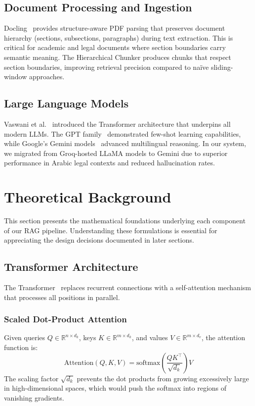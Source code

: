 \documentclass[12pt, a4paper]{article}
\begin{document}
\subsection{Document Processing and Ingestion}
Docling~\cite{docling2024} provides structure-aware PDF parsing that
preserves document hierarchy (sections, subsections, paragraphs) during
text extraction. This is critical for academic and legal documents where
section boundaries carry semantic meaning. The Hierarchical Chunker
produces chunks that respect section boundaries, improving retrieval
precision compared to na\"ive sliding-window approaches.

\subsection{Large Language Models}
Vaswani et al.~\cite{vaswani2017attention} introduced the Transformer
architecture that underpins all modern LLMs. The GPT family~\cite{brown2020gpt3}
demonstrated few-shot learning capabilities, while Google's Gemini
models~\cite{google2024gemini} advanced multilingual reasoning. In our
system, we migrated from Groq-hosted LLaMA models to Gemini due to
superior performance in Arabic legal contexts and reduced hallucination rates.


\section{Theoretical Background}

This section presents the mathematical foundations underlying each component
of our RAG pipeline. Understanding these formulations is essential for
appreciating the design decisions documented in later sections.

\subsection{Transformer Architecture}

The Transformer~\cite{vaswani2017attention} replaces recurrent connections
with a self-attention mechanism that processes all positions in parallel.

\subsubsection{Scaled Dot-Product Attention}
Given queries $Q \in \mathbb{R}^{n \times d_k}$, keys $K \in \mathbb{R}^{m \times d_k}$,
and values $V \in \mathbb{R}^{m \times d_v}$, the attention function is:
\begin{equation}
  \text{Attention}(Q, K, V) = \text{softmax}\!\left(\frac{Q K^\top}{\sqrt{d_k}}\right) V
  \label{eq:attention}
\end{equation}
The scaling factor $\sqrt{d_k}$ prevents the dot products from growing
excessively large in high-dimensional spaces, which would push the softmax
into regions of vanishing gradients.
\end{document}
